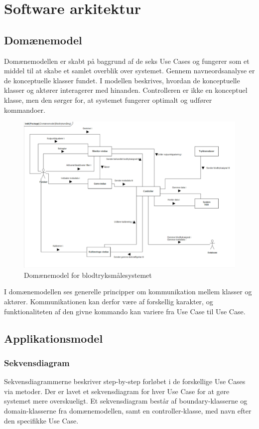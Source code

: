\section{Software arkitektur}

\subsection{Domænemodel}
Domænemodellen er skabt på baggrund af de seks Use Cases og fungerer som et middel til at skabe et samlet overblik over systemet. Gennem navneordsanalyse er de konceptuelle klasser fundet. I modellen beskrives, hvordan de konceptuelle klasser og aktører interagerer med hinanden. Controlleren er ikke en konceptuel klasse, men den sørger for, at systemet fungerer optimalt og udfører kommandoer.

\begin{figure}[H]
	\centering
	\includegraphics[width=1 \textwidth]{Figurer/screenshot}
	\caption{Domænemodel for blodtryksmålesystemet}
\end{figure}
I domænemodellen ses generelle principper om kommunikation mellem klasser og aktører. Kommunikationen kan derfor være af forskellig karakter, og funktionaliteten af den givne kommando kan variere fra Use Case til Use Case.

\subsection{Applikationsmodel}

\subsubsection{Sekvensdiagram}
Sekvensdiagrammerne beskriver step-by-step forløbet i de forskellige Use Cases via metoder. Der er lavet et sekvensdiagram for hver Use Case for at gøre systemet mere overskueligt. Et sekvensdiagram består af boundary-klasserne og domain-klasserne fra domænemodellen, samt en controller-klasse, med navn efter den specifikke Use Case.

